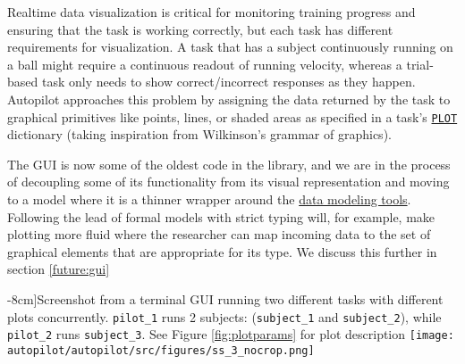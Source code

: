 Realtime data visualization is critical for monitoring training progress and ensuring that the task is working correctly, but each task has different requirements for visualization. A task that has a subject continuously running on a ball might require a continuous readout of running velocity, whereas a trial-based task only needs to show correct/incorrect responses as they happen. Autopilot approaches this problem by assigning the data returned by the task to graphical primitives like points, lines, or shaded areas as specified in a task's \hyperref[sec:taskcomponents]{\texttt{PLOT}} dictionary (taking inspiration from Wilkinson's grammar of graphics\citep{wilkinsonGrammarGraphics2012}).

The GUI is now some of the oldest code in the library, and we are in the process of decoupling some of its functionality from its visual representation and moving to a model where it is a thinner wrapper around the \hyperref[sec:data]{data modeling tools}. Following the lead of formal models with strict typing will, for example, make plotting more fluid where the researcher can map incoming data to the set of graphical elements that are appropriate for its type. We discuss this further in section \ref{future:gui}

\begin{figure*}[hb!]
\caption[][-8cm]{Screenshot from a terminal GUI running two different tasks with different plots concurrently. \texttt{pilot\_1} runs 2 subjects: (\texttt{subject\_1} and \texttt{subject\_2}), while \texttt{pilot\_2} runs \texttt{subject\_3}. See Figure \ref{fig:plotparams} for plot description}
\label{fig:gui}
\texttt{[image: autopilot/autopilot/src/figures/ss\_3\_nocrop.png]}
\end{figure*}%
